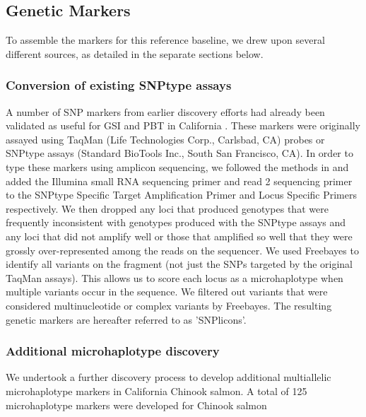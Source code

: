 \subsection*{Genetic Markers}

To assemble the markers for this reference baseline, we drew upon several different
sources, as detailed in the separate sections below.

\subsubsection*{Conversion of existing SNPtype assays}

A number of SNP markers from earlier discovery efforts \citep{clemento2011discovery} had already 
been validated as useful for GSI
and PBT in California \citep{clemento2014evaluation}. These markers were originally assayed
using TaqMan (Life Technologies Corp., Carlsbad, CA) probes or SNPtype assays (Standard BioTools Inc., South San Francisco, CA).
In order to type these markers using amplicon sequencing, we followed the methods in
\citet{campbell2015genotyping} and added the Illumina small RNA sequencing primer and 
read 2 sequencing primer to the SNPtype Specific Target Amplification Primer and Locus 
Specific Primers respectively.  We then dropped any loci that produced genotypes that were 
frequently inconsistent with genotypes produced with the SNPtype assays and any loci that 
did not amplify well or those that amplified so well that they were grossly over-represented
among the reads on the sequencer.  We 
used Freebayes \citep{garrison2012haplotype} to identify all variants on the fragment (not just the SNPs targeted by the original TaqMan assays).  This allows us to score each locus as a
microhaplotype \citep{baetscher2018microhaplotypes} when multiple variants occur in the sequence.  We filtered out variants
that were considered multinucleotide or complex variants by Freebayes. The resulting genetic markers are hereafter referred to as 'SNPlicons'.

\subsubsection*{Additional microhaplotype discovery}

We undertook a further discovery process to develop additional multiallelic
microhaplotype \citep{baetscher2018microhaplotypes} markers in California Chinook salmon. A total of 125 microhaplotype markers were developed for Chinook salmon 

